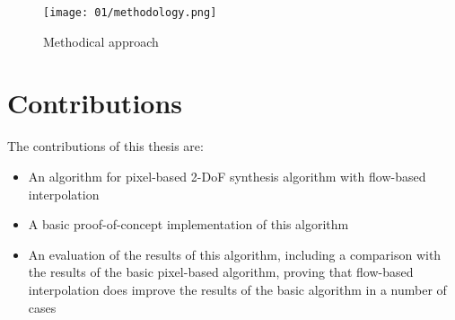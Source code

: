 \begin{figure}
		\centering
		\texttt{[image: 01/methodology.png]}
		\caption{Methodical approach}
		\label{fig:methodology}
\end{figure}

\section*{Contributions}
The contributions of this thesis are:
\begin{itemize}
  \item An algorithm for pixel-based 2-DoF synthesis algorithm with flow-based interpolation
  \item A basic proof-of-concept implementation of this algorithm
  \item An evaluation of the results of this algorithm, including a comparison with the results of the basic pixel-based algorithm, proving that flow-based interpolation does improve the results of the basic algorithm in a number of cases
\end{itemize}





